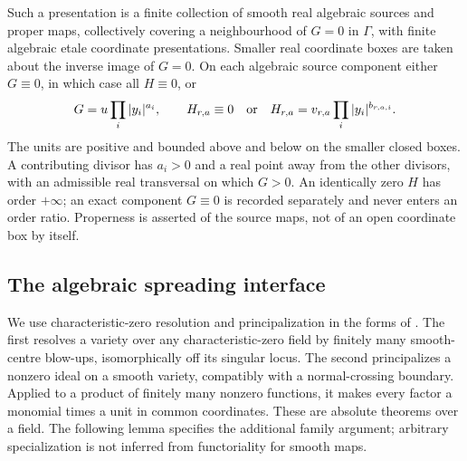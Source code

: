 \begin{definition}\label{def:monomial}
Such a presentation is a finite collection of smooth real algebraic
sources and proper maps, collectively covering a neighbourhood of $G=0$
in $\Gamma$, with finite algebraic etale coordinate presentations.
Smaller real coordinate boxes are taken about the inverse image of $G=0$.
On each algebraic source component either $G\equiv0$, in which case
all $H\equiv0$, or
\begin{equation}\label{eq:monomial}
 G=u\prod_i|y_i|^{a_i},\qquad
 H_{r,a}\equiv0\quad\hbox{or}\quad
 H_{r,a}=v_{r,a}\prod_i|y_i|^{b_{r,a,i}}.
\end{equation}
The units are positive and bounded above and below on the smaller closed
boxes. A contributing divisor has $a_i>0$ and a real point away from
the other divisors, with an admissible real transversal on which $G>0$.
An identically zero $H$ has order $+\infty$; an exact component $G\equiv0$
is recorded separately and never enters an order ratio. Properness is
asserted of the source maps, not of an open coordinate box by itself.
\end{definition}

\subsection{The algebraic spreading interface}
We use characteristic-zero resolution and principalization in the forms
of \cite[Theorems 1.1 and 1.3]{BM08}. The first resolves a variety over
any characteristic-zero field by finitely many smooth-centre blow-ups,
isomorphically off its singular locus. The second principalizes a
nonzero ideal on a smooth variety, compatibly with a normal-crossing
boundary. Applied to a product of finitely many nonzero functions, it
makes every factor a monomial times a unit in common coordinates.
These are absolute theorems over a field. The following lemma specifies
the additional family argument; arbitrary specialization is not inferred
from functoriality for smooth maps.

